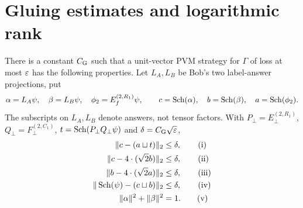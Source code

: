 \section{Gluing estimates and logarithmic rank}\label{sec:rank}
\begin{lemma}\label{lem:robustgluing}
There is a constant $C_{\rm G}$ such that a unit-vector PVM strategy for
$\Gamma$ of loss at most $\varepsilon$ has the following properties.
Let $L_A,L_B$ be Bob's two label-answer projections, put
\[
\alpha=L_A\psi,\quad\beta=L_B\psi,\quad
\phi_2=E_f^{(2,R_1)}\psi,\qquad
c=\operatorname{Sch}(\alpha),\quad b=\operatorname{Sch}(\beta),\quad a=\operatorname{Sch}(\phi_2).
\]
The subscripts on $L_A,L_B$ denote answers, not tensor factors.
With $P_\bot=E_\bot^{(2,R_1)}$, $Q_\bot=F_\bot^{(2,C_1)}$,
$t=\operatorname{Sch}(P_\bot Q_\bot\psi)$ and $\delta=C_{\rm G}\sqrt{\varepsilon}$,
\begin{align}\label{eq:fivegluing}
\|c-(a\sqcup t)\|_2&\leq\delta,\tag{i}\\
\|c-4\mathbin{\cdot}(\sqrt2 b)\|_2&\leq\delta,\tag{ii}\\
\|b-4\mathbin{\cdot}(\sqrt2 a)\|_2&\leq\delta,\tag{iii}\\
\|\operatorname{Sch}(\psi)-(c\sqcup b)\|_2&\leq\delta,\tag{iv}\\
\|\alpha\|^2+\|\beta\|^2&=1.\tag{v}
\end{align}
\end{lemma}
